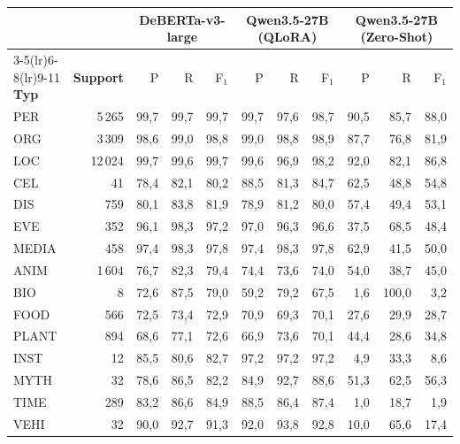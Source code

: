 \begin{tabular}{lrrrrrrrrrr}
    \toprule
    & & \multicolumn{3}{c}{\textbf{DeBERTa-v3-large}} &
      \multicolumn{3}{c}{\textbf{Qwen3.5-27B (QLoRA)}} &
      \multicolumn{3}{c}{\textbf{Qwen3.5-27B (Zero-Shot)}} \\
    \cmidrule(lr){3-5}\cmidrule(lr){6-8}\cmidrule(lr){9-11}
    \textbf{Typ} & \textbf{Support} & P & R & F$_1$ & P & R & F$_1$ & P & R & F$_1$ \\
    \midrule
    PER   & 5\,265 & 99,7 & 99,7 & 99,7 & 99,7 & 97,6 & 98,7 & 90,5 & 85,7 & 88,0 \\
    ORG   & 3\,309 & 98,6 & 99,0 & 98,8 & 99,0 & 98,8 & 98,9 & 87,7 & 76,8 & 81,9 \\
    LOC   & 12\,024 & 99,7 & 99,6 & 99,7 & 99,6 & 96,9 & 98,2 & 92,0 & 82,1 & 86,8 \\
    CEL   & 41 & 78,4 & 82,1 & 80,2 & 88,5 & 81,3 & 84,7 & 62,5 & 48,8 & 54,8 \\
    DIS   & 759 & 80,1 & 83,8 & 81,9 & 78,9 & 81,2 & 80,0 & 57,4 & 49,4 & 53,1 \\
    EVE   & 352 & 96,1 & 98,3 & 97,2 & 97,0 & 96,3 & 96,6 & 37,5 & 68,5 & 48,4 \\
    MEDIA & 458 & 97,4 & 98,3 & 97,8 & 97,4 & 98,3 & 97,8 & 62,9 & 41,5 & 50,0 \\
    ANIM  & 1\,604 & 76,7 & 82,3 & 79,4 & 74,4 & 73,6 & 74,0 & 54,0 & 38,7 & 45,0 \\
    BIO   & 8 & 72,6 & 87,5 & 79,0 & 59,2 & 79,2 & 67,5 & 1,6 & 100,0 & 3,2 \\
    FOOD  & 566 & 72,5 & 73,4 & 72,9 & 70,9 & 69,3 & 70,1 & 27,6 & 29,9 & 28,7 \\
    PLANT & 894 & 68,6 & 77,1 & 72,6 & 66,9 & 73,6 & 70,1 & 44,4 & 28,6 & 34,8 \\
    INST  & 12 & 85,5 & 80,6 & 82,7 & 97,2 & 97,2 & 97,2 & 4,9 & 33,3 & 8,6 \\
    MYTH  & 32 & 78,6 & 86,5 & 82,2 & 84,9 & 92,7 & 88,6 & 51,3 & 62,5 & 56,3 \\
    TIME  & 289 & 83,2 & 86,6 & 84,9 & 88,5 & 86,4 & 87,4 & 1,0 & 18,7 & 1,9 \\
    VEHI  & 32 & 90,0 & 92,7 & 91,3 & 92,0 & 93,8 & 92,8 & 10,0 & 65,6 & 17,4 \\
    \bottomrule
\end{tabular}
